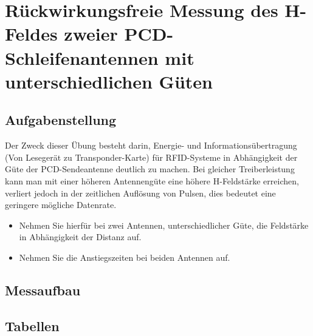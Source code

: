 \documentclass[12pt,a4paper,ngerman]{article}
\begin{document}


%
%

\section{Rückwirkungsfreie Messung des H-Feldes zweier PCD-Schleifenantennen mit unterschiedlichen Güten}
\subsection{Aufgabenstellung}
Der Zweck dieser Übung besteht darin, Energie- und Informationsübertragung (Von Lesegerät zu Transponder-Karte) für RFID-Systeme in Abhängigkeit der Güte der PCD-Sendeantenne deutlich zu machen. Bei gleicher Treiberleistung kann man mit einer höheren Antennengüte eine höhere H-Feldstärke erreichen, verliert jedoch in der zeitlichen Auflösung von Pulsen, dies bedeutet eine geringere mögliche Datenrate. 
\begin{itemize}
\item Nehmen Sie hierfür bei zwei Antennen, unterschiedlicher Güte, die Feldstärke in Abhängigkeit der Distanz auf.
\item Nehmen Sie die Anstiegszeiten bei beiden Antennen auf.
\end{itemize}

\subsection{Messaufbau}

\subsection{Tabellen}
\end{document}
